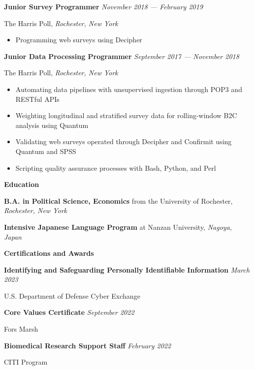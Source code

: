 \documentclass[12pt]{article}
\begin{document}
\textbf{Junior Survey Programmer} \hfill \textit{November 2018 --- February 2019}
\par The Harris Poll, \textit{Rochester, New York}
\begin{itemize}[]
\item Programming web surveys using Decipher
\end{itemize}

\textbf{Junior Data Processing Programmer} \hfill \textit{September 2017 --- November 2018}
\par The Harris Poll, \textit{Rochester, New York}
\begin{itemize}[]
\item Automating data pipelines with unsupervised ingestion through POP3 and RESTful APIs
\item Weighting longitudinal and stratified survey data for rolling-window B2C analysis using Quantum
\item Validating web surveys operated through Decipher and Confirmit using Quantum and SPSS
\item Scripting quality assurance processes with Bash, Python, and Perl
\end{itemize}



\vspace{.5em}
\textbf{\Large Education} \hrulefill
\vspace{.5em}

\textbf{B.A. in Political Science, Economics} from the University of Rochester, \textit{Rochester, New York}

\vspace{.25em}
\textbf{Intensive Japanese Language Program} at Nanzan University, \textit{Nagoya, Japan}



\vspace{.75em}
\textbf{\Large Certifications and Awards} \hrulefill
\vspace{.5em}

\textbf{Identifying and Safeguarding Personally Identifiable Information} \hfill \textit{March 2023}
\par U.S. Department of Defense Cyber Exchange

\vspace{.25em}
\textbf{Core Values Certificate} \hfill \textit{September 2022}
\par Fors Marsh

\vspace{.25em}
\textbf{Biomedical Research Support Staff} \hfill \textit{February 2022}
\par CITI Program
\end{document}
